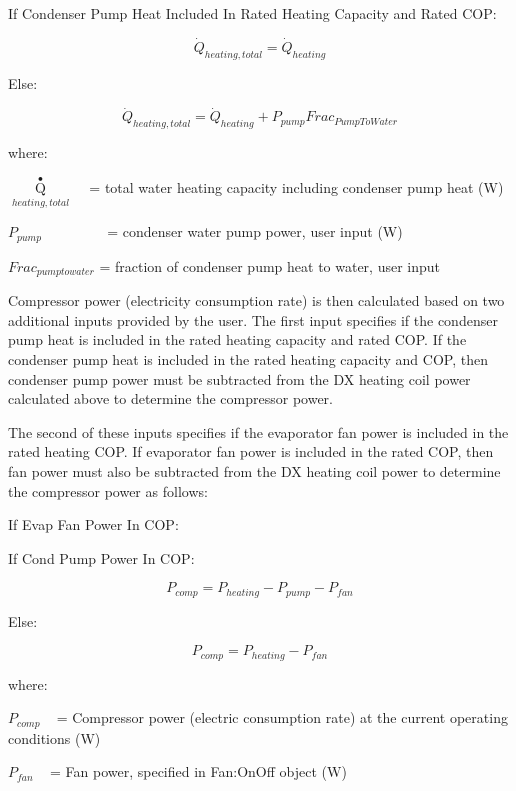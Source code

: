 If Condenser Pump Heat Included In Rated Heating Capacity and Rated COP:

\begin{equation}
  \dot{Q}_{heating,total} = \dot{Q}_{heating}
\end{equation}

Else:

\begin{equation}
  \dot{Q}_{heating,total} = \dot{Q}_{heating} + P_{pump}Frac_{PumpToWater}
\end{equation}

where:

\({\mathop Q\limits^ \bullet_{heating,total}}\) ~ = total water heating capacity including condenser pump heat (W)

\({P_{pump}}\) ~~~~~~~~ = condenser water pump power, user input (W)

\(Fra{c_{pumptowater}}\) = fraction of condenser pump heat to water, user input

Compressor power (electricity consumption rate) is then calculated based on two additional inputs provided by the user. The first input specifies if the condenser pump heat is included in the rated heating capacity and rated COP. If the condenser pump heat is included in the rated heating capacity and COP, then condenser pump power must be subtracted from the DX heating coil power calculated above to determine the compressor power.

The second of these inputs specifies if the evaporator fan power is included in the rated heating COP. If evaporator fan power is included in the rated COP, then fan power must also be subtracted from the DX heating coil power to determine the compressor power as follows:

If Evap Fan Power In COP:

  If Cond Pump Power In COP:

\begin{equation}
  P_{comp} = P_{heating}-P_{pump}-P_{fan}
\end{equation}

Else:

\begin{equation}
  P_{comp} = P_{heating}-P_{fan}
\end{equation}

where:

\({P_{comp}}\) ~ = Compressor power (electric consumption rate) at the current operating conditions (W)

\({P_{fan}}\) ~ = Fan power, specified in Fan:OnOff object (W)

